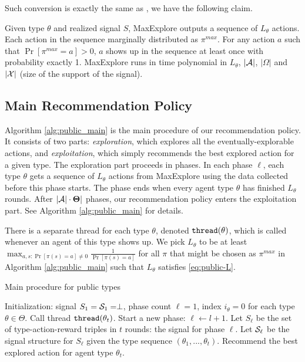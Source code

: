 Such conversion is exactly the same as \cite{ICexplorationGames-ec16-working}, we have the following claim.

\begin{claim}
\label{clm:maxexplore}
Given type $\theta$ and realized signal $S$, MaxExplore outputs a sequence of $L_{\theta}$ actions.
Each action in the sequence marginally distributed as $\pi^{max}$.
For any action $a$ such that $\Pr[\pi^{max} =a] >0$, $a$ shows up in the sequence at least once with probability exactly 1.
MaxExplore runs in time polynomial in $L_{\theta}$, $|\A|$, $|\varOmega|$ and $|\X|$ (size of the support of the signal).
\end{claim}

\subsection{Main Recommendation Policy}
\label{sec:public_main}

Algorithm \ref{alg:public_main} is the main procedure of our recommendation policy. It consists of two parts: \emph{exploration}, which explores all the eventually-explorable actions, and \emph{exploitation}, which simply recommends the best explored action for a given type. The exploration part proceeds in phases. In each phase $\ell$, each type $\theta$ gets a sequence of $L_{\theta}$ actions from MaxExplore using the data collected before this phase starts. The phase ends when every agent type $\theta$ has finished $L_{\theta}$ rounds.  After $|\A| \cdot \varTheta|$ phases, our recommendation policy enters the exploitation part. See Algorithm \ref{alg:public_main} for  details.

There is a separate thread for each type $\theta$, denoted $\thread(\theta)$,  which is called whenever an agent of this type shows up. We pick $L_{\theta}$ to be at least $\max_{a,s: \Pr[\pi(s)=a] \neq 0} \frac{1}{\Pr[\pi(s)=a]}$ for all $\pi$ that might be chosen as $\pi^{max}$ in Algorithm \ref{alg:public_main} such that $L_{\theta}$ satisfies \eqref{eq:public-L}.

 \begin{algorithm}[H]
    \caption{Main procedure for public types }
    	\label{alg:public_main}
    \begin{algorithmic}[1]
    \STATE Initialization: signal $S_1 = \S_1 = \perp$,
             phase count $\ell = 1$, index $i_{\theta} = 0$ for each type $\theta \in \varTheta$.
		\IF {$\ell \leq |\A|\cdot |\varTheta|$}
		 \STATE {}
		Call thread $\thread(\theta_t)$.
				\STATE Start a new phase: $\ell \leftarrow l + 1$.
				\STATE Let $S_\ell$ be the set of type-action-reward triples in $t$ rounds: the signal for phase $\ell$.
        \STATE Let $\S_\ell$ be the signal structure for $S_\ell$ given the type sequence $(\theta_1,...,\theta_t)$.
			\ENDIF
		\ELSE
			\STATE {}
			Recommend the best explored action for agent type $\theta_t$.
		\ENDIF
	\ENDFOR
     \end{algorithmic}
\end{algorithm}

